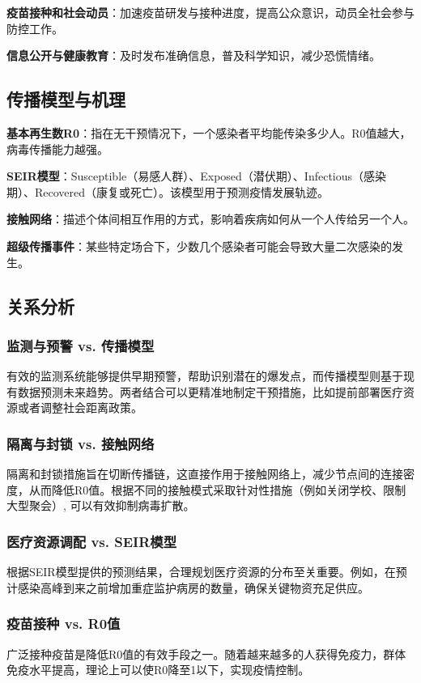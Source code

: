 \documentclass[UTF8,a4paper]{ctexart}
\begin{document}
	\textbf{疫苗接种和社会动员}：加速疫苗研发与接种进度，提高公众意识，动员全社会参与防控工作。
	
	\textbf{信息公开与健康教育}：及时发布准确信息，普及科学知识，减少恐慌情绪。
	
	\subsection{传播模型与机理}
	\textbf{基本再生数R0}：指在无干预情况下，一个感染者平均能传染多少人。R0值越大，病毒传播能力越强。
	
	\textbf{SEIR模型}：Susceptible（易感人群）、Exposed（潜伏期）、Infectious（感染期）、Recovered（康复或死亡）。该模型用于预测疫情发展轨迹。
	
	\textbf{接触网络}：描述个体间相互作用的方式，影响着疾病如何从一个人传给另一个人。
	
	\textbf{超级传播事件}：某些特定场合下，少数几个感染者可能会导致大量二次感染的发生。
	
	\subsection{关系分析}
	
	\subsubsection{监测与预警 vs. 传播模型}
	有效的监测系统能够提供早期预警，帮助识别潜在的爆发点，而传播模型则基于现有数据预测未来趋势。两者结合可以更精准地制定干预措施，比如提前部署医疗资源或者调整社会距离政策。
	
	\subsubsection{隔离与封锁 vs. 接触网络}
	隔离和封锁措施旨在切断传播链，这直接作用于接触网络上，减少节点间的连接密度，从而降低R0值。根据不同的接触模式采取针对性措施（例如关闭学校、限制大型聚会）, 可以有效抑制病毒扩散。
	
	\subsubsection{医疗资源调配 vs. SEIR模型}
	根据SEIR模型提供的预测结果，合理规划医疗资源的分布至关重要。例如，在预计感染高峰到来之前增加重症监护病房的数量，确保关键物资充足供应。
	
	\subsubsection{疫苗接种 vs. R0值}
	广泛接种疫苗是降低R0值的有效手段之一。随着越来越多的人获得免疫力，群体免疫水平提高，理论上可以使R0降至1以下，实现疫情控制。
	
\end{document}
